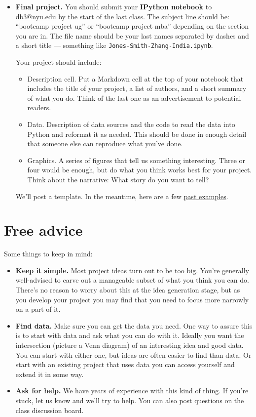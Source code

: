 \documentclass[11pt]{article}
\begin{document}
\begin{itemize}
\item {\bf Final project.}
You should submit your {\bf IPython notebook\/} to \href{mailto:db3@nyu.edu}{db3@nyu.edu}
by the start of the last class.
The subject line should be:  ``bootcamp project ug'' or ``bootcamp project mba''
depending on the section you are in.
The file name should be your last names separated by dashes and a short title ---
something like {\tt Jones-Smith-Zhang-India.ipynb}.

Your project should include:
\begin{itemize}
\item Description cell.  Put a Markdown cell at the top of your notebook that
   includes the title of your project, a list of authors, and a short summary
  of what you do.  Think of the last one as an advertisement to potential readers.
\item Data.  Description of data sources and the code to read the data into Python
and reformat it as needed.
This should be done in enough detail that someone else can reproduce what you've done.
\item Graphics.  A series of figures that tell us something interesting.
Three or four would be enough, but do what you think works best for your project.
Think about the narrative:  What story do you want to tell?
\end{itemize}
We'll post a template.
In the meantime, here are a few \href{https://github.com/DaveBackus/Data_Bootcamp/tree/master/Projects}
{past examples}.
\end{itemize}


\section*{Free advice}

Some things to keep in mind:
%
\begin{itemize}
\item {\bf Keep it simple.}
Most project ideas turn out to be too big.  You're generally well-advised
to carve out a manageable subset of what you think you can do.
There's no reason to worry about this at the idea generation stage,
but as you develop your project you may find that you need to focus
more narrowly on a part of it.

\item {\bf Find data.}  Make sure you can get the data you need.
One way to assure this is to start with data and ask what you can do with it.
Ideally you want the intersection (picture a Venn diagram) of an interesting
idea and good data.  You can start with either one, but ideas are often easier to
find than data.
Or start with an existing project that uses data you can access yourself
and extend it in some way.


\item {\bf Ask for help.}
We have years of experience with this kind of thing.
If you're stuck, let us know and we'll try to help.
You can also post questions on the class discussion board.

\end{itemize}
\end{document}

